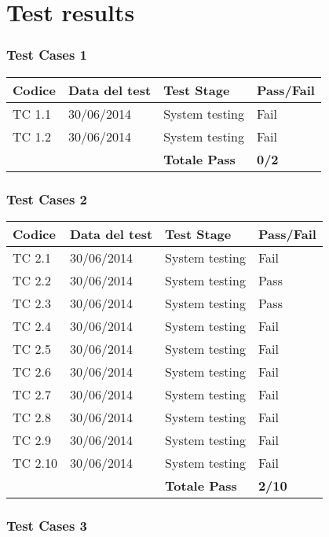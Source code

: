 \chapter{Test results}

\subsection{Test Cases 1}

\begin{tabular}{|p{3cm}|p{3cm}|p{3cm}|p{3cm}|}
	\hline
	\rowcolor{Gray}
	\textbf{Codice} & \textbf{Data del test} & \textbf{Test Stage}  & \textbf{Pass/Fail}\tabularnewline
	\hline
	TC 1.1			& 30/06/2014 			& System testing		& Fail \tabularnewline
	\hline
	TC 1.2			& 30/06/2014 			& System testing			& Fail \tabularnewline
	\hline
					& 						& \textbf{Totale Pass}	& \textbf{0/2} \tabularnewline
	\hline
\end{tabular}

\subsection{Test Cases 2}

\begin{tabular}{|p{3cm}|p{3cm}|p{3cm}|p{3cm}|}
	\hline
	\rowcolor{Gray}
	\textbf{Codice} & \textbf{Data del test} & \textbf{Test Stage} & \textbf{Pass/Fail}\tabularnewline
	\hline
	TC 2.1			& 30/06/2014 			& System testing		& Fail \tabularnewline
	\hline
	TC 2.2			& 30/06/2014 			& System testing		& Pass \tabularnewline
	\hline
	TC 2.3			& 30/06/2014 			& System testing		& Pass \tabularnewline
	\hline
	TC 2.4			& 30/06/2014 			& System testing		& Fail \tabularnewline
	\hline
	TC 2.5			& 30/06/2014 			& System testing		& Fail \tabularnewline
	\hline
	TC 2.6			& 30/06/2014 			& System testing		& Fail \tabularnewline
	\hline
	TC 2.7			& 30/06/2014 			& System testing		& Fail \tabularnewline
	\hline
	TC 2.8			& 30/06/2014 			& System testing		& Fail \tabularnewline
	\hline
	TC 2.9			& 30/06/2014 			& System testing		& Fail \tabularnewline
	\hline
	TC 2.10			& 30/06/2014 			& System testing		& Fail \tabularnewline
	\hline
					& 						& \textbf{Totale Pass}	& \textbf{2/10} \tabularnewline
	\hline
\end{tabular}

\subsection{Test Cases 3}

